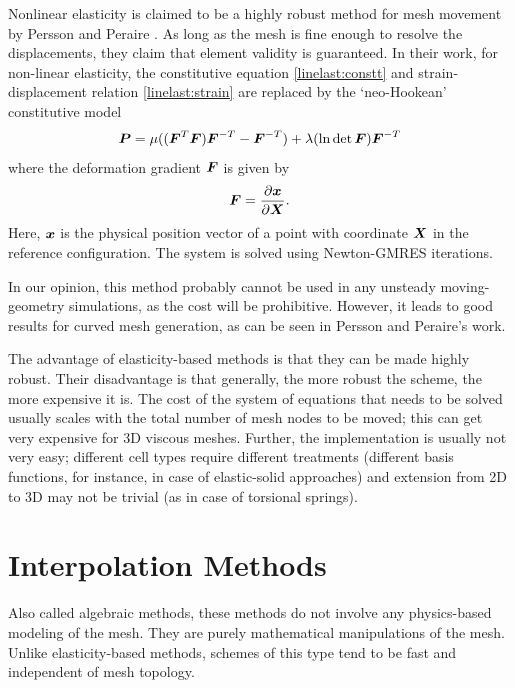  Nonlinear elasticity is claimed to be a highly robust method for mesh movement by Persson and Peraire \cite{curve:persson}. As long as the mesh is fine enough to resolve the displacements, they claim that element validity is guaranteed. In their work, for non-linear elasticity, the constitutive equation \eqref{linelast:constt} and strain-displacement relation \eqref{linelast:strain} are replaced by the `neo-Hookean' constitutive model
 \begin{equation}
 \boldsymbol{P} = \mu ((\boldsymbol{F}^T\boldsymbol{F})\boldsymbol{F}^{-T} - \boldsymbol{F}^{-T}) + \lambda(\ln \det\boldsymbol{F})\boldsymbol{F}^{-T}
 \end{equation}
 where the deformation gradient $\boldsymbol{F}$ is given by
 \[
 \boldsymbol{F} = \frac{\partial\boldsymbol{x}}{\partial\boldsymbol{X}}.
 \]
 Here, $\boldsymbol{x}$ is the physical position vector of a point with coordinate $\boldsymbol{X}$ in the reference configuration. The system is solved using Newton-GMRES iterations.
 
 In our opinion, this method probably cannot be used in any unsteady moving-geometry simulations, as the cost will be prohibitive. However, it leads to good results for curved mesh generation, as can be seen in Persson and Peraire's work.
 
 The advantage of elasticity-based methods is that they can be made highly robust. Their disadvantage is that generally, the more robust the scheme, the more expensive it is. The cost of the system of equations that needs to be solved usually scales with the total number of mesh nodes to be moved; this can get very expensive for 3D viscous meshes. Further, the implementation is usually not very easy; different cell types require different treatments (different basis functions, for instance, in case of elastic-solid approaches) and extension from 2D to 3D may not be trivial (as in case of torsional springs).
 
 \section{Interpolation  Methods}
 Also called algebraic methods, these methods do not involve any physics-based modeling of the mesh. They are purely mathematical manipulations of the mesh. Unlike elasticity-based methods, schemes of this type tend to be fast and independent of mesh topology. 
 
